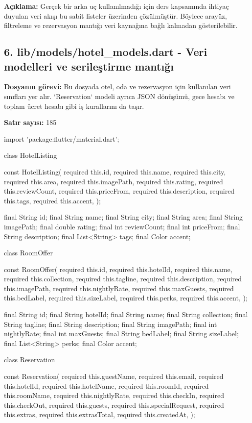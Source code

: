 \documentclass[11pt,a4paper]{article}
\begin{document}
\textbf{Açıklama:} Gerçek bir arka uç kullanılmadığı için ders kapsamında ihtiyaç duyulan veri akışı bu sabit listeler üzerinden çözülmüştür. Böylece arayüz, filtreleme ve rezervasyon mantığı veri kaynağına bağlı kalmadan gösterilebilir.

\clearpage
\subsection{6. lib/models/hotel\_models.dart - Veri modelleri ve serileştirme mantığı}
\textbf{Dosyanın görevi:} Bu dosyada otel, oda ve rezervasyon için kullanılan veri sınıfları yer alır. `Reservation` modeli ayrıca JSON dönüşümü, gece hesabı ve toplam ücret hesabı gibi iş kurallarını da taşır.

\textbf{Satır sayısı:} 185

\begin{codeblock}
import 'package:flutter/material.dart';

class HotelListing {
  const HotelListing({
    required this.id,
    required this.name,
    required this.city,
    required this.area,
    required this.imagePath,
    required this.rating,
    required this.reviewCount,
    required this.priceFrom,
    required this.description,
    required this.tags,
    required this.accent,
  });

  final String id;
  final String name;
  final String city;
  final String area;
  final String imagePath;
  final double rating;
  final int reviewCount;
  final int priceFrom;
  final String description;
  final List<String> tags;
  final Color accent;
}

class RoomOffer {
  const RoomOffer({
    required this.id,
    required this.hotelId,
    required this.name,
    required this.collection,
    required this.tagline,
    required this.description,
    required this.imagePath,
    required this.nightlyRate,
    required this.maxGuests,
    required this.bedLabel,
    required this.sizeLabel,
    required this.perks,
    required this.accent,
  });

  final String id;
  final String hotelId;
  final String name;
  final String collection;
  final String tagline;
  final String description;
  final String imagePath;
  final int nightlyRate;
  final int maxGuests;
  final String bedLabel;
  final String sizeLabel;
  final List<String> perks;
  final Color accent;
}

class Reservation {
  const Reservation({
    required this.guestName,
    required this.email,
    required this.hotelId,
    required this.hotelName,
    required this.roomId,
    required this.roomName,
    required this.nightlyRate,
    required this.checkIn,
    required this.checkOut,
    required this.guests,
    required this.specialRequest,
    required this.extras,
    required this.extrasTotal,
    required this.createdAt,
  });

}
\end{codeblock}
\end{document}
